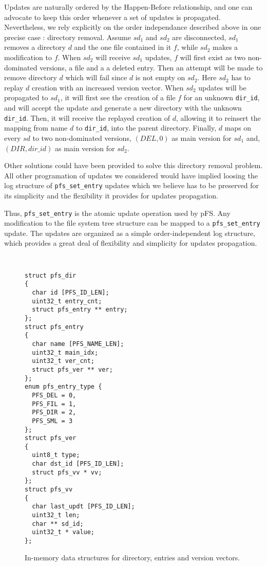 Updates are naturally ordered by the Happen-Before relationship, and
one can advocate to keep this order whenever a set of updates is
propagated. Nevertheless, we rely explicitly on the order independance
described above in one precise case : directory removal. Assume
$sd_{1}$ and $sd_{2}$ are disconnected, $sd_{1}$ removes a
directory $d$ and the one file contained in it $f$, while $sd_{2}$
makes a modification to $f$. When $sd_{2}$ will receive $sd_{1}$
updates, $f$ will first exist as two non-dominated versions, a file
and a a deleted entry. Then an attempt will be made to remove
directory $d$ which will fail since $d$ is not empty on $sd_{2}$. Here
$sd_{2}$ has to replay $d$ creation with an increased version
vector. When $sd_{2}$ updates will be propagated to $sd_{1}$, it will
first see the creation of a file $f$ for an unknown {\tt dir\_id}, and
will accept the update and generate a new directory with the unknown
{\tt dir\_id}. Then, it will receive the replayed creation of $d$,
allowing it to reinsert the mapping from name $d$ to {\tt dir\_id}, into
the parent directory. Finally, $d$ maps on every $sd$ to two non-dominated
versions, $(DEL,0)$ as main version for $sd_{1}$ and, $(DIR, dir\_id)$ as main version
for $sd_{2}$.


Other solutions could have been provided to solve this directory
removal problem. All other programation of updates we considered would
have implied loosing the log structure of {\tt pfs\_set\_entry}
updates which we believe has to be preserved for its simplicity and
the flexibility it provides for updates propagation.

Thus, {\tt pfs\_set\_entry} is the atomic update operation used by
pFS. Any modification to the file system tree structure can be mapped
to a {\tt pfs\_set\_entry} update. The updates are organized as a
simple order-independent log structure, which provides a great deal of
flexibility and simplicity for updates propagation.

\begin{figure}[t]
\begin{center}
{\tt \small
\begin{verbatim}
struct pfs_dir
{
  char id [PFS_ID_LEN];
  uint32_t entry_cnt;
  struct pfs_entry ** entry;
};
struct pfs_entry
{
  char name [PFS_NAME_LEN];
  uint32_t main_idx;
  uint32_t ver_cnt; 
  struct pfs_ver ** ver;
};
enum pfs_entry_type {
  PFS_DEL = 0,
  PFS_FIL = 1,
  PFS_DIR = 2,
  PFS_SML = 3 
};
struct pfs_ver
{
  uint8_t type;
  char dst_id [PFS_ID_LEN];
  struct pfs_vv * vv;
};
struct pfs_vv
{ 
  char last_updt [PFS_ID_LEN];
  uint32_t len;
  char ** sd_id;
  uint32_t * value;
};
\end{verbatim}
}
\end{center}
\caption{\label{MemStruct}
{\small In-memory data structures for directory, entries and version
  vectors.}}
\end{figure}

